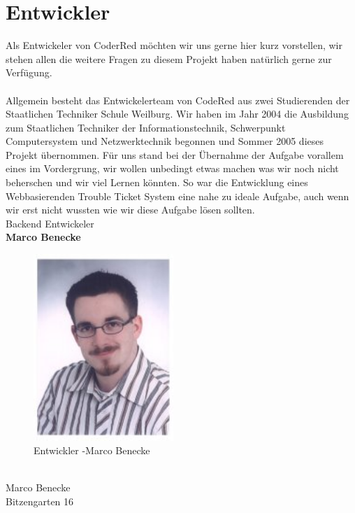 \chapter{Entwickler}  %
\label{chapter:Entwickler}  %

Als Entwickeler von CoderRed möchten wir uns gerne hier kurz vorstellen, wir stehen allen die weitere Fragen zu diesem Projekt haben natürlich gerne zur Verfügung. \\
\\
Allgemein besteht das Entwickelerteam von CodeRed aus zwei Studierenden der Staatlichen Techniker Schule Weilburg. Wir haben im Jahr 2004 die Ausbildung zum Staatlichen Techniker der Informationstechnik, Schwerpunkt Computersystem und Netzwerktechnik begonnen und Sommer 2005 dieses Projekt übernommen. Für uns stand bei der Übernahme der Aufgabe vorallem eines im Vordergrung, wir wollen unbedingt etwas machen was wir noch nicht beherschen und wir viel Lernen könnten. So war die Entwicklung eines Webbasierenden Trouble Ticket System eine nahe zu ideale Aufgabe, auch wenn wir erst nicht wussten wie wir diese Aufgabe lösen sollten.   
\pagebreak
\\
Backend Entwickeler \\
\textbf{Marco Benecke}
\\
\begin{figure}[h]
\begin{center}
   \includegraphics[width=150pt]{../bilder/marcob.jpg}
   \caption{Entwickler -Marco Benecke}
   \label{Entwickler - Backend und Datenbank}
\end{center}
\end{figure}
\\
Marco Benecke \\
Bitzengarten 16 \\
